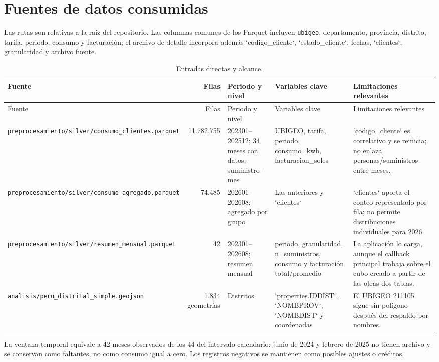 \documentclass[11pt,a4paper]{article}
\begin{document}
\section{Fuentes de datos consumidas}
Las rutas son relativas a la raíz del repositorio. Las columnas comunes de los Parquet incluyen \texttt{ubigeo}, departamento, provincia, distrito, tarifa, periodo, consumo y facturación; el archivo de detalle incorpora además `codigo\_cliente`, `estado\_cliente`, fechas, `clientes`, granularidad y archivo fuente.
\begin{longtable}{p{3.5cm}r p{2.8cm}p{3.4cm}p{4.4cm}}
\caption{Entradas directas y alcance.}\label{tab:fuentes}\\
\toprule Fuente & Filas & Periodo y nivel & Variables clave & Limitaciones relevantes\\\midrule\endfirsthead
\toprule Fuente & Filas & Periodo y nivel & Variables clave & Limitaciones relevantes\\\midrule\endhead
\texttt{preprocesamiento/silver/consumo\_clientes.parquet} & 11.782.755 & 202301--202512; 34 meses con datos; suministro-mes & UBIGEO, tarifa, periodo, consumo\_kwh, facturacion\_soles & `codigo_cliente` es correlativo y se reinicia; no enlaza personas/suministros entre meses.\\
\texttt{preprocesamiento/silver/consumo\_agregado.parquet} & 74.485 & 202601--202608; agregado por grupo & Las anteriores y `clientes` & `clientes` aporta el conteo representado por fila; no permite distribuciones individuales para 2026.\\
\texttt{preprocesamiento/silver/resumen\_mensual.parquet} & 42 & 202301--202608; resumen mensual & periodo, granularidad, n\_suministros, consumo y facturación total/promedio & La aplicación lo carga, aunque el callback principal trabaja sobre el cubo creado a partir de las otras dos tablas.\\
\texttt{analisis/peru\_distrital\_simple.geojson} & 1.834 geometrías & Distritos & `properties.IDDIST`, `NOMBPROV`, `NOMBDIST` y coordenadas & El UBIGEO 211105 sigue sin polígono después del respaldo por nombres.\\
\bottomrule\end{longtable}
La ventana temporal equivale a 42 meses observados de los 44 del intervalo calendario: junio de 2024 y febrero de 2025 no tienen archivo y se conservan como faltantes, no como consumo igual a cero. Los registros negativos se mantienen como posibles ajustes o créditos.
\end{document}
